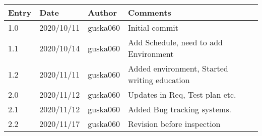 \begin{tabular}{ |p{3cm}|p{3cm}|p{3cm}|p{3cm}|  }
 

 \hline
 Entry & Date & Author &Comments \\
 \hline
 1.0   & 2020/10/11  &guska060 &  Initial commit\\
 

 \hline
 1.1   & 2020/10/14  &guska060 & Add Schedule, need to add Environment\\
 
 \hline
 1.2   & 2020/11/11  &guska060 & Added environment, Started writing education\\
 
 \hline
 2.0   & 2020/11/12  &guska060 & Updates in Req, Test plan etc.\\
 
 \hline
 2.1   & 2020/11/12  &guska060 & Added Bug tracking systems.\\
  \hline
 2.2   & 2020/11/17  &guska060 & Revision before inspection\\
 
 \hline
\end{tabular}